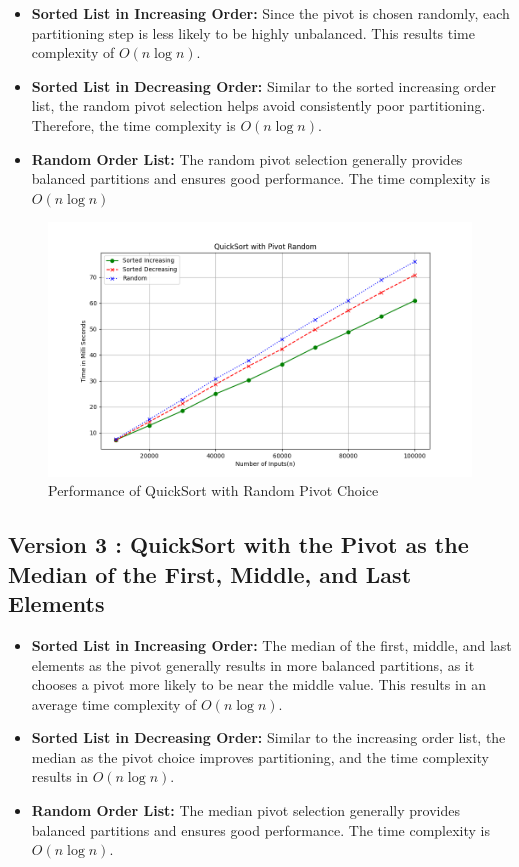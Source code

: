 \documentclass[a4paper,12pt]{report}
\begin{document}
\begin{itemize}
    \item \textbf{Sorted List in Increasing Order:} Since the pivot is chosen randomly, each partitioning step is less likely to be highly unbalanced. This results time complexity of \(O(n \log n)\). 
    
    \item \textbf{Sorted List in Decreasing Order:} Similar to the sorted increasing order list, the random pivot selection helps avoid consistently poor partitioning. Therefore, the time complexity is \(O(n \log n)\). 

    \item \textbf{Random Order List:} The random pivot selection generally provides balanced partitions and ensures good performance. The  time complexity is \(O(n \log n)\)
\end{itemize}
\begin{figure}[H]
    \centering
    \includegraphics[width=1.1\textwidth]{./QuickSortPivotRandom.png}
    \caption{Performance of QuickSort with Random Pivot Choice}
    \label{fig:quicksort_random_pivot}
\end{figure}

\subsection{Version 3 : QuickSort with the Pivot as the Median of the First, Middle, and Last Elements} 
\begin{itemize}
    \item \textbf{Sorted List in Increasing Order:} The median of the first, middle, and last elements as the pivot generally results in more balanced partitions, as it chooses a pivot more likely to be near the middle value. This results in an average time complexity of \(O(n \log n)\). 

    \item \textbf{Sorted List in Decreasing Order:}  Similar to the increasing order list, the median as the pivot choice improves partitioning, and the time complexity results in \(O(n \log n)\).

    \item \textbf{Random Order List:} The median pivot selection generally provides balanced partitions and ensures good performance. The time complexity is \(O(n \log n)\).
\end{itemize}
\end{document}
